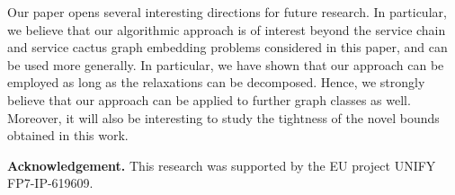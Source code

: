 \documentclass[10pt, conference, letterpaper]{IEEEtran}
\begin{document}
Our paper opens several interesting directions
for future research. In particular, we believe that our
algorithmic approach is of interest beyond the service chain 
and service cactus graph embedding problems considered in this paper, and can be used 
more generally. In particular, we have shown that our approach can be employed as long as the relaxations can be decomposed. Hence, we strongly believe that our approach can be applied to further graph classes as well.
Moreover, it will also be interesting 
to study the tightness of the novel bounds obtained in this work.


\textbf{Acknowledgement.}
This research was supported by the EU project UNIFY FP7-IP-619609.




{



}
\end{document}
